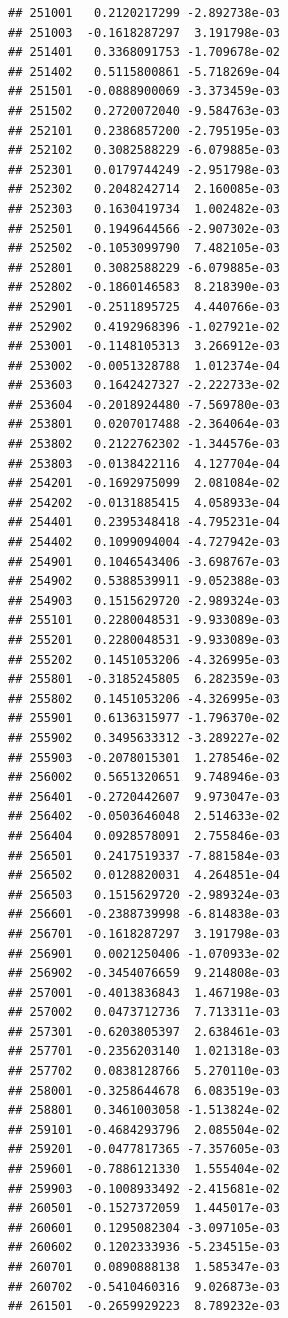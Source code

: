 \begin{frame}[fragile]
\begin{verbatim}
## 251001   0.2120217299 -2.892738e-03
## 251003  -0.1618287297  3.191798e-03
## 251401   0.3368091753 -1.709678e-02
## 251402   0.5115800861 -5.718269e-04
## 251501  -0.0888900069 -3.373459e-03
## 251502   0.2720072040 -9.584763e-03
## 252101   0.2386857200 -2.795195e-03
## 252102   0.3082588229 -6.079885e-03
## 252301   0.0179744249 -2.951798e-03
## 252302   0.2048242714  2.160085e-03
## 252303   0.1630419734  1.002482e-03
## 252501   0.1949644566 -2.907302e-03
## 252502  -0.1053099790  7.482105e-03
## 252801   0.3082588229 -6.079885e-03
## 252802  -0.1860146583  8.218390e-03
## 252901  -0.2511895725  4.440766e-03
## 252902   0.4192968396 -1.027921e-02
## 253001  -0.1148105313  3.266912e-03
## 253002  -0.0051328788  1.012374e-04
## 253603   0.1642427327 -2.222733e-02
## 253604  -0.2018924480 -7.569780e-03
## 253801   0.0207017488 -2.364064e-03
## 253802   0.2122762302 -1.344576e-03
## 253803  -0.0138422116  4.127704e-04
## 254201  -0.1692975099  2.081084e-02
## 254202  -0.0131885415  4.058933e-04
## 254401   0.2395348418 -4.795231e-04
## 254402   0.1099094004 -4.727942e-03
## 254901   0.1046543406 -3.698767e-03
## 254902   0.5388539911 -9.052388e-03
## 254903   0.1515629720 -2.989324e-03
## 255101   0.2280048531 -9.933089e-03
## 255201   0.2280048531 -9.933089e-03
## 255202   0.1451053206 -4.326995e-03
## 255801  -0.3185245805  6.282359e-03
## 255802   0.1451053206 -4.326995e-03
## 255901   0.6136315977 -1.796370e-02
## 255902   0.3495633312 -3.289227e-02
## 255903  -0.2078015301  1.278546e-02
## 256002   0.5651320651  9.748946e-03
## 256401  -0.2720442607  9.973047e-03
## 256402  -0.0503646048  2.514633e-02
## 256404   0.0928578091  2.755846e-03
## 256501   0.2417519337 -7.881584e-03
## 256502   0.0128820031  4.264851e-04
## 256503   0.1515629720 -2.989324e-03
## 256601  -0.2388739998 -6.814838e-03
## 256701  -0.1618287297  3.191798e-03
## 256901   0.0021250406 -1.070933e-02
## 256902  -0.3454076659  9.214808e-03
## 257001  -0.4013836843  1.467198e-03
## 257002   0.0473712736  7.713311e-03
## 257301  -0.6203805397  2.638461e-03
## 257701  -0.2356203140  1.021318e-03
## 257702   0.0838128766  5.270110e-03
## 258001  -0.3258644678  6.083519e-03
## 258801   0.3461003058 -1.513824e-02
## 259101  -0.4684293796  2.085504e-02
## 259201  -0.0477817365 -7.357605e-03
## 259601  -0.7886121330  1.555404e-02
## 259903  -0.1008933492 -2.415681e-02
## 260501  -0.1527372059  1.445017e-03
## 260601   0.1295082304 -3.097105e-03
## 260602   0.1202333936 -5.234515e-03
## 260701   0.0890888138  1.585347e-03
## 260702  -0.5410460316  9.026873e-03
## 261501  -0.2659929223  8.789232e-03

\end{verbatim}
\end{frame}
